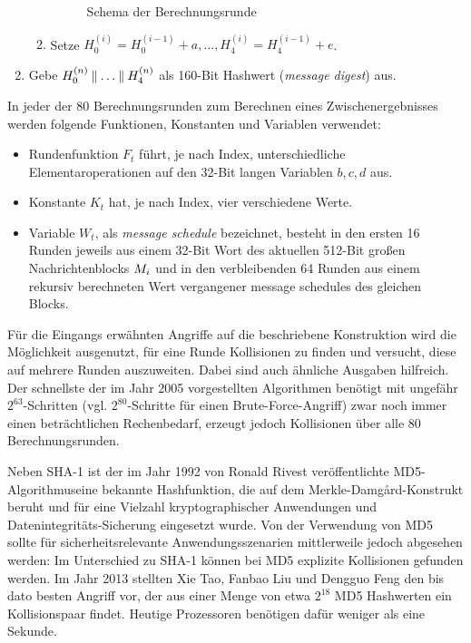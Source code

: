 \begin{enumerate}
\begin{enumerate}
\begin{figure}[h]
      \caption{Schema der Berechnungsrunde}
    \end{figure}
  \item Setze $H_0^{(i)} = H_0^{(i-1)} + a, \dots, H_4^{(i)} = H_4^{(i-1)} + e$.
  \end{enumerate}
\item Gebe $H_0^{(n)} \mathbin{\|} \dots \mathbin{\|} H_4^{(n)}$ als 160-Bit
  Hashwert (\emph{message digest}) aus. 
\end{enumerate} 

In jeder der 80 Berechnungsrunden zum Berechnen eines
Zwischenergebnisses werden folgende Funktionen, Konstanten und Variablen
verwendet: 
\begin{itemize}
\item Rundenfunktion $F_{t}$ führt, je nach Index, unterschiedliche
  Elementaroperationen auf den 32-Bit langen Variablen $b, c, d$ aus.
\item Konstante $K_{t}$ hat, je nach Index, vier verschiedene Werte.
\item Variable $W_{t}$, als \emph{message schedule} bezeichnet, besteht
  in den ersten 16 Runden jeweils aus einem 32-Bit Wort des aktuellen
  512-Bit großen Nachrichtenblocks $M_{i}$ und in den
  verbleibenden 64 Runden aus einem rekursiv berechneten Wert
  vergangener message schedules des gleichen Blocks.
\end{itemize}

Für die Eingangs erwähnten Angriffe auf die beschriebene Konstruktion
wird die Möglichkeit ausgenutzt, für eine Runde Kollisionen zu finden
und versucht, diese auf mehrere Runden auszuweiten. Dabei sind auch
ähnliche Ausgaben hilfreich. Der schnellste der im Jahr 2005
vorgestellten Algorithmen benötigt mit ungefähr $2^{63}$-Schritten
(vgl. $2^{80}$-Schritte für einen Brute-Force-Angriff) zwar noch immer
einen beträchtlichen Rechenbedarf, erzeugt jedoch Kollisionen über alle
80 Berechnungsrunden.

Neben SHA-1 ist der im Jahr 1992 von Ronald Rivest veröffentlichte
MD5-Algorithmus\indexMDFive eine bekannte Hashfunktion, die auf dem
Merkle-Damgård-Konstrukt beruht und für eine Vielzahl kryptographischer
Anwendungen und Datenintegritäts-Sicherung eingesetzt wurde. Von der
Verwendung von MD5 sollte für sicherheitsrelevante Anwendungsszenarien
mittlerweile jedoch abgesehen werden: Im Unterschied zu SHA-1 können bei
MD5 explizite Kollisionen gefunden werden. Im Jahr 2013 stellten Xie
Tao, Fanbao Liu und Dengguo Feng den bis dato besten Angriff vor, der
aus einer Menge von etwa $2^{18}$ MD5 Hashwerten ein Kollisionspaar
findet. Heutige Prozessoren benötigen dafür weniger als eine Sekunde.

